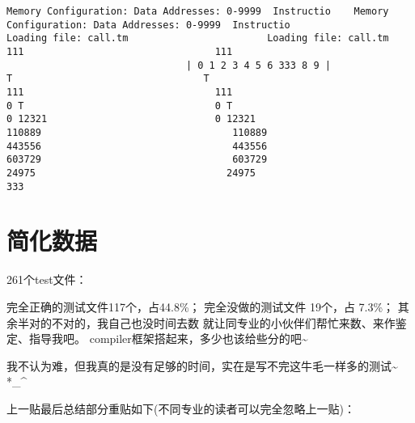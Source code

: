 \documentclass[12pt]{book}
\begin{document}
\begin{lstlisting}
Memory Configuration: Data Addresses: 0-9999  Instructio    Memory 
Configuration: Data Addresses: 0-9999  Instructio
Loading file: call.tm                        Loading file: call.tm
111                                 111 
                               | 0 1 2 3 4 5 6 333 8 9 |
T                                 T 
111                                 111 
0 T                                 0 T 
0 12321                             0 12321 
110889                                 110889 
443556                                 443556 
603729                                 603729 
24975                                 24975 
333
\end{lstlisting}

\chapter{简化数据}
\label{sec-13}

261个test文件：

完全正确的测试文件117个，占44.8\%；
完全没做的测试文件 19个，占 7.3\%；
其余半对的不对的，我自己也没时间去数
就让同专业的小伙伴们帮忙来数、来作鉴定、指导我吧。
compiler框架搭起来，多少也该给些分的吧\textasciitilde{}~

我不认为难，但我真的是没有足够的时间，实在是写不完这牛毛一样多的测试\textasciitilde{}~ *\_\^{}

上一贴最后总结部分重贴如下(不同专业的读者可以完全忽略上一贴)：
\end{document}
